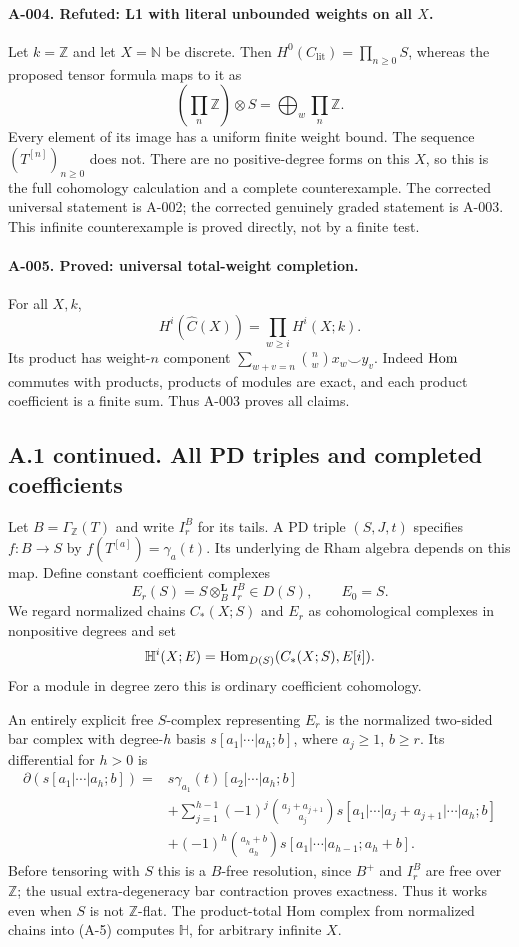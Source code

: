 \paragraph{A-004. Refuted: L1 with literal unbounded weights on all $X$.}
Let $k=\mathbb Z$ and let $X=\mathbb N$ be discrete. Then
$H^0(C_{\mathrm{lit}})=\prod_{n\geq0}S$, whereas the proposed tensor
formula maps to it as
\[
 (\prod_n\mathbb Z)\otimes S=\bigoplus_w\prod_n\mathbb Z.
\]
Every element of its image has a uniform finite weight bound. The
sequence $(T^{[n]})_{n\geq0}$ does not. There are no positive-degree
forms on this $X$, so this is the full cohomology calculation and a
complete counterexample. The corrected universal statement is A-002;
the corrected genuinely graded statement is A-003. This infinite
counterexample is proved directly, not by a finite test.

\paragraph{A-005. Proved: universal total-weight completion.}
For all $X,k$,
\[
 H^i(\widehat C(X))=\prod_{w\geq i}H^i(X;k).
 \tag{A-4}
\]
Its product has weight-$n$ component
$\sum_{w+v=n}\binom nw x_w\smile y_v$. Indeed $\operatorname{Hom}$ commutes
with products, products of modules are exact, and each product
coefficient is a finite sum. Thus A-003 proves all claims.

\subsection{A.1 continued. All PD triples and completed coefficients}

Let $B=\Gamma_{\mathbb Z}(T)$ and write $I_r^B$ for its tails. A PD
triple $(S,J,t)$ specifies $f:B\to S$ by
$f(T^{[a]})=\gamma_a(t)$. Its underlying de Rham algebra depends on
this map. Define constant coefficient complexes
\[
 E_r(S)=S\otimes_B^{\mathbf L}I_r^B\in D(S),\qquad E_0=S.
\]
We regard normalized chains $C_*(X;S)$ and $E_r$ as cohomological
complexes in nonpositive degrees and set
\[
 \mathbb H^i(X;E)=\operatorname{Hom}_{D(S)}(C_*(X;S),E[i]).
\]
For a module in degree zero this is ordinary coefficient cohomology.

An entirely explicit free $S$-complex representing $E_r$ is the
normalized two-sided bar complex with degree-$h$ basis
$s[a_1|\cdots|a_h;b]$, where $a_j\geq1$, $b\geq r$. Its
differential for $h>0$ is
\begin{align*}
 \partial(s[a_1|\cdots|a_h;b])={}&
 s\gamma_{a_1}(t)[a_2|\cdots|a_h;b]\\
 &+\sum_{j=1}^{h-1}(-1)^j\binom{a_j+a_{j+1}}{a_j}
 s[a_1|\cdots|a_j+a_{j+1}|\cdots|a_h;b]\\
 &+(-1)^h\binom{a_h+b}{a_h}
 s[a_1|\cdots|a_{h-1};a_h+b].
 \tag{A-5}\label{eq:bar}
\end{align*}
Before tensoring with $S$ this is a $B$-free resolution, since
$B^+$ and $I_r^B$ are free over $\mathbb Z$; the usual extra-degeneracy
bar contraction proves exactness. Thus it works even when $S$ is
not $\mathbb Z$-flat. The product-total Hom complex from normalized
chains into (A-5) computes $\mathbb H$, for arbitrary infinite $X$.


